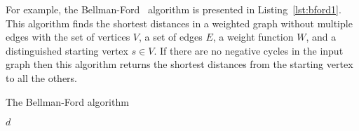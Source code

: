 For example, the Bellman-Ford~\cite{bellman1958routing,ford2015flows} algorithm is presented in Listing~\ref{lst:bford1}. This algorithm finds the shortest distances in a weighted graph without multiple edges with the set of vertices $V$, a set of edges $E$, a weight function $W$, and a distinguished starting vertex $s \in V$. If there are no negative cycles in the input graph then this algorithm returns the shortest distances from the starting vertex to all the others.

\begin{algorithm}
\begin{algorithmic}[1]
\caption{The Bellman-Ford algorithm}
\label{lst:bford1}
    \EndFor
        \EndIf
    \EndFor
            \State \Return {}
        \EndIf
    \EndFor
    \State \Return $d$
\EndFunction
\end{algorithmic}
\end{algorithm}

